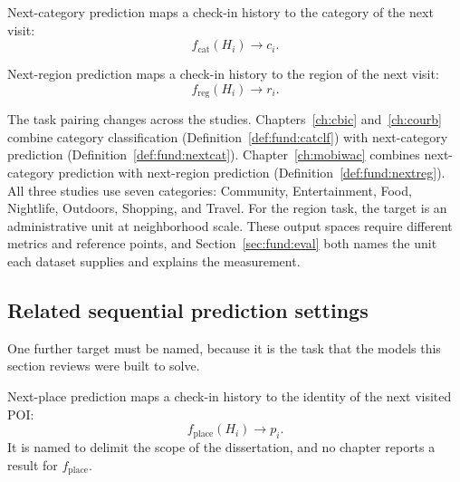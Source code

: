 \begin{definition}\label{def:fund:nextcat}
    Next-category prediction maps a check-in history to the category of the next visit:
    \begin{equation}
        f_{\mathrm{cat}}(H_i)\longrightarrow c_i.
    \end{equation}
\end{definition}

\begin{definition}\label{def:fund:nextreg}
    Next-region prediction maps a check-in history to the region of the next visit:
    \begin{equation}
        f_{\mathrm{reg}}(H_i)\longrightarrow r_i.
    \end{equation}
\end{definition}

The task pairing changes across the studies. Chapters~\ref{ch:cbic}
and~\ref{ch:courb} combine category classification
(Definition~\ref{def:fund:catclf}) with next-category prediction
(Definition~\ref{def:fund:nextcat}). Chapter~\ref{ch:mobiwac} combines next-category
prediction with next-region prediction (Definition~\ref{def:fund:nextreg}). All three
studies use seven categories: Community, Entertainment, Food, Nightlife, Outdoors,
Shopping, and Travel. For the region task, the target is an administrative unit at
neighborhood scale. These output spaces require different metrics and reference points,
and Section~\ref{sec:fund:eval} both names the unit each dataset supplies and explains
the measurement.

\subsection{Related sequential prediction settings}

One further target must be named, because it is the task that the models this section
reviews were built to solve.

\begin{definition}\label{def:fund:nextplace}
    Next-place prediction maps a check-in history to the identity of the next visited POI:
    \begin{equation}
        f_{\mathrm{place}}(H_i)\longrightarrow p_i.
    \end{equation}
    It is named to delimit the scope of the dissertation, and no chapter reports a result
    for $f_{\mathrm{place}}$.
\end{definition}

